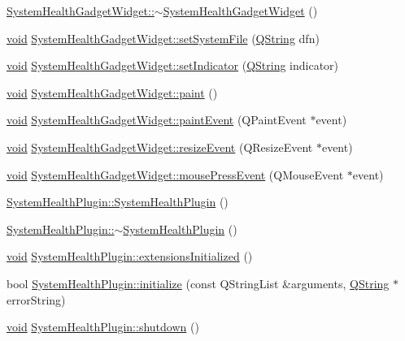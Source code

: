\begin{DoxyCompactItemize}
\item 
\hyperlink{group___system_health_plugin_gaafd1c69ed4569708eef2b628c1125ea8}{\-System\-Health\-Gadget\-Widget\-::$\sim$\-System\-Health\-Gadget\-Widget} ()
\item 
\hyperlink{group___u_a_v_objects_plugin_ga444cf2ff3f0ecbe028adce838d373f5c}{void} \hyperlink{group___system_health_plugin_ga1caae283affc79dc1e9e0303d39d4158}{\-System\-Health\-Gadget\-Widget\-::set\-System\-File} (\hyperlink{group___u_a_v_objects_plugin_gab9d252f49c333c94a72f97ce3105a32d}{\-Q\-String} dfn)
\item 
\hyperlink{group___u_a_v_objects_plugin_ga444cf2ff3f0ecbe028adce838d373f5c}{void} \hyperlink{group___system_health_plugin_gaf6ee345730445a2552355fcd54cb33cf}{\-System\-Health\-Gadget\-Widget\-::set\-Indicator} (\hyperlink{group___u_a_v_objects_plugin_gab9d252f49c333c94a72f97ce3105a32d}{\-Q\-String} indicator)
\item 
\hyperlink{group___u_a_v_objects_plugin_ga444cf2ff3f0ecbe028adce838d373f5c}{void} \hyperlink{group___system_health_plugin_ga58a24548867f2bb40b36dfc3e0fc4b9e}{\-System\-Health\-Gadget\-Widget\-::paint} ()
\item 
\hyperlink{group___u_a_v_objects_plugin_ga444cf2ff3f0ecbe028adce838d373f5c}{void} \hyperlink{group___system_health_plugin_gaefb5569e2941f96ea452bb2e43575aed}{\-System\-Health\-Gadget\-Widget\-::paint\-Event} (\-Q\-Paint\-Event $\ast$event)
\item 
\hyperlink{group___u_a_v_objects_plugin_ga444cf2ff3f0ecbe028adce838d373f5c}{void} \hyperlink{group___system_health_plugin_gacfa993929fde9cc3153dafa5a6509d65}{\-System\-Health\-Gadget\-Widget\-::resize\-Event} (\-Q\-Resize\-Event $\ast$event)
\item 
\hyperlink{group___u_a_v_objects_plugin_ga444cf2ff3f0ecbe028adce838d373f5c}{void} \hyperlink{group___system_health_plugin_ga2558a85d789a3f51c15c92ac329b26d7}{\-System\-Health\-Gadget\-Widget\-::mouse\-Press\-Event} (\-Q\-Mouse\-Event $\ast$event)
\item 
\hyperlink{group___system_health_plugin_gaccd196e55a7a3a7b48fcc59ee62a5a8b}{\-System\-Health\-Plugin\-::\-System\-Health\-Plugin} ()
\item 
\hyperlink{group___system_health_plugin_ga8c480b9596c0968c7bece8bb13874fd5}{\-System\-Health\-Plugin\-::$\sim$\-System\-Health\-Plugin} ()
\item 
\hyperlink{group___u_a_v_objects_plugin_ga444cf2ff3f0ecbe028adce838d373f5c}{void} \hyperlink{group___system_health_plugin_gac8ab8add53079a86d3ab978ac8c41438}{\-System\-Health\-Plugin\-::extensions\-Initialized} ()
\item 
bool \hyperlink{group___system_health_plugin_ga0b4b0272fcc0fd567c889344ee5f68d5}{\-System\-Health\-Plugin\-::initialize} (const \-Q\-String\-List \&arguments, \hyperlink{group___u_a_v_objects_plugin_gab9d252f49c333c94a72f97ce3105a32d}{\-Q\-String} $\ast$error\-String)
\item 
\hyperlink{group___u_a_v_objects_plugin_ga444cf2ff3f0ecbe028adce838d373f5c}{void} \hyperlink{group___system_health_plugin_gacf43a9878cbe82c0cf68216d045bc158}{\-System\-Health\-Plugin\-::shutdown} ()
\end{DoxyCompactItemize}


